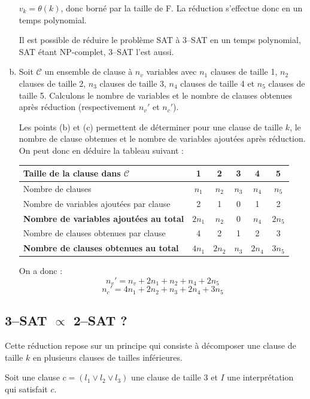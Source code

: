 \begin{enumerate}[(a)]
$v_k = \theta(k)$, donc borné par la taille de F. La réduction s'effectue donc en un temps polynomial.

Il est possible de réduire le problème SAT à 3--SAT en un temps polynomial, SAT étant NP-complet, 3--SAT l'est aussi.
\item Soit $\mathcal{C}$ un ensemble de clause à $n_v$ variables avec $n_1$ clauses de taille 1, $n_2$ clauses de taille 2, $n_3$ clauses de taille 3, $n_4$ clauses de taille 4 et $n_5$ clauses de taille 5. Calculons le nombre de variables et le nombre de clauses obtenues après réduction (respectivement $n_v'$ et $n_c'$).

Les points (b) et (c) permettent de déterminer pour une clause de taille $k$, le nombre de clause obtenues et le nombre de variables ajoutées après réduction. On peut donc en déduire la tableau suivant :

\begin{tabularx}{\textwidth}{| X || c | c | c | c | c |}
\hline
Taille de la clause dans $\mathcal{C}$	& 1 	& 2 	& 3 	& 4 	& 5 	\\
\hline
Nombre de clauses						& $n_1$	& $n_2$	& $n_3$	& $n_4$	& $n_5$	\\
\hline
Nombre de variables ajoutées par clause	& 2		& 1 	& 0 	& 1 	& 2 	\\
\hline
\textbf{Nombre de variables ajoutées au total} 	& $2n_1$& $n_2$	& 0		& $n_4$	& $2n_5$\\
\hline
Nombre de clauses obtenues par clause 	& 4 	& 2 	& 1 	& 2 	& 3 	\\
\hline
\textbf{Nombre de clauses obtenues au total}	& $4n_1$& $2n_2$& $n_3$	& $2n_4$& $3n_5$\\
\hline

\end{tabularx}

On a donc :
\[ n_v' = n_v + 2n_1 + n_2 + n_4 + 2n_5 \]
\[ n_c' = 4n_1 + 2n_2 + n_3 + 2n_4 + 3n_5 \]
\end{enumerate}

\subsection{3--SAT $\propto$ 2--SAT ?}
Cette réduction repose sur un principe qui consiste à décomposer une clause de taille $k$ en plusieurs clauses de tailles inférieures.

Soit une clause $c = (l_1 \vee l_2 \vee l_3)$ une clause de taille 3 et $I$ une interprétation qui satisfait $c$.

